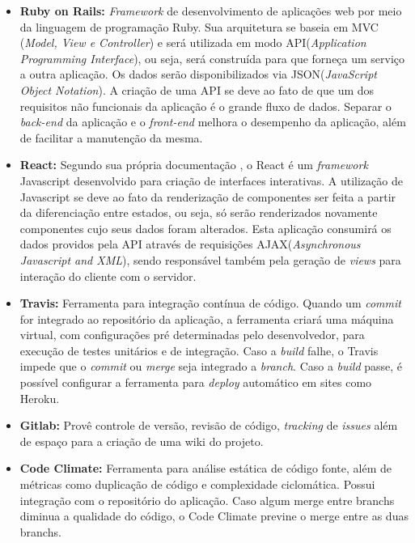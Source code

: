 \begin{itemize}

  \item \textbf{Ruby on Rails:} \textit{Framework} de desenvolvimento de aplicações web por meio da linguagem de programação Ruby. Sua arquitetura se baseia em MVC (\textit{Model, View e Controller}) e será utilizada em modo API(\textit{Application Programming Interface}), ou seja, será construída para que forneça um serviço a outra aplicação. Os dados serão disponibilizados via JSON(\textit{JavaScript Object Notation}). A criação de uma API se deve ao fato de que um dos requisitos não funcionais da aplicação é o grande fluxo de dados. Separar o \textit{back-end} da aplicação e o \textit{front-end} melhora o desempenho da aplicação, além de facilitar a manutenção da mesma.

  \item \textbf{React:} Segundo sua própria documentação \cite{React:2014}, o React é um \textit{framework} Javascript desenvolvido para criação de interfaces interativas. A utilização de Javascript se deve ao fato da renderização de componentes ser feita a partir da diferenciação entre estados, ou seja, só serão renderizados novamente componentes cujo seus dados foram alterados. Esta aplicação consumirá os dados providos pela API através de requisições AJAX(\textit{Asynchronous Javascript and XML}), sendo responsável também pela geração de \textit{views} para interação do cliente com o servidor.

  \item \textbf{Travis:} Ferramenta para integração contínua de código. Quando um \textit{commit} for integrado ao repositório da aplicação, a ferramenta criará uma máquina virtual, com configurações pré determinadas pelo desenvolvedor, para execução de testes unitários e de integração. Caso a \textit{build} falhe, o Travis impede que o \textit{commit} ou \textit{merge} seja integrado a \textit{branch}. Caso a \textit{build} passe, é possível configurar a ferramenta para \textit{deploy} automático em sites como Heroku.

  \item \textbf{Gitlab:} Provê controle de versão, revisão de código, \textit{tracking} de \textit{issues} além de espaço para a criação de uma wiki do projeto.

  \item \textbf{Code Climate:} Ferramenta para análise estática de código fonte, além de métricas como duplicação de código e complexidade ciclomática. Possui integração com o repositório do aplicação. Caso algum merge entre branchs diminua a qualidade do código, o Code Climate previne o merge entre as duas branchs.

\end{itemize}

